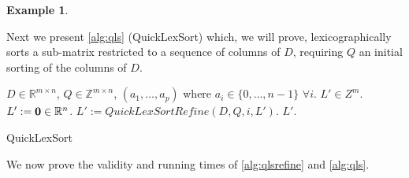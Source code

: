 \documentclass[a4paper,10pt,reqno]{amsart}
\def\ve#1{\mathchoice{\mbox{\boldmath$\displaystyle\bf#1$}}
{\mbox{\boldmath$\textstyle\bf#1$}}
{\mbox{\boldmath$\scriptstyle\bf#1$}}
{\mbox{\boldmath$\scriptscriptstyle\bf#1$}}}
\newcommand\Z{\mathbb Z}
\newcommand\R{\mathbb R}
\theoremstyle{definition}
\newtheorem{example}{Example}
\begin{document}
\begin{example}
\end{example}

Next we present \autoref{alg:qls} (QuickLexSort) which, we will prove,
lexicographically sorts a sub-matrix restricted to a sequence of columns of
$D$, requiring $Q$ an initial sorting of the columns of $D$.  


\begin{algorithm}[!h]
\begin{algorithmic}[1]
    \REQUIRE $D \in \R^{m\times n}$, $Q \in \Z^{m\times n}$, $(a_1,\ldots,a_p)$ where $ a_i \in \{0,\ldots,n-1\}$ $\forall i$.
    \ENSURE $L' \in Z^m$.
    \STATE $L' := \ve 0 \in \R^n$.
        \STATE $L' := QuickLexSortRefine(D,Q,i,L')$.
    \ENDFOR
    \RETURN $L'$.
\end{algorithmic}
\caption{QuickLexSort}
\label{alg:qls}
\end{algorithm}

We now prove the validity and running times of \autoref{alg:qlsrefine}
and \autoref{alg:qls}. 
\end{document}
